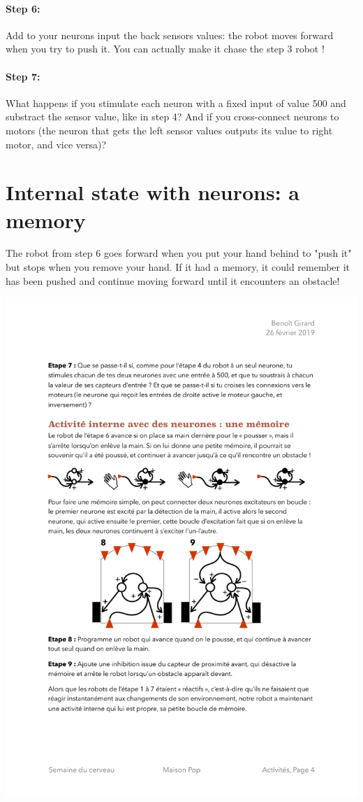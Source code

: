 \documentclass[12pt]{article}
\begin{document}
\paragraph{Step 6:} Add to your neurons input the back sensors values: the robot moves forward when you try to push it. You can actually make it chase the step 3 robot !

\paragraph{Step 7:} What happens if you stimulate each neuron with a fixed input of value 500 and substract the sensor value, like in step 4? And if you cross-connect neurons to motors (the neuron that gets the left sensor values outputs its value to right motor, and vice versa)?

\section{Internal state with neurons: a memory}

The robot from step 6 goes forward when you put your hand behind to "push it" but stops when you remove your hand. If it had a memory, it could remember it has been pushed and continue moving forward until it encounters an obstacle!

\includegraphics{../Memoire.pdf}
\end{document}
